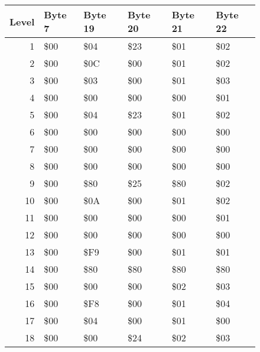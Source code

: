 \begin{figure}[H]
  {
    \setlength{\tabcolsep}{3.0pt}
    \setlength\cmidrulewidth{\heavyrulewidth} %
    \begin{adjustbox}{width=\textwidth}

      \begin{tabular}{rlllll}
        \toprule
        Level & Byte 7    & Byte 19   & Byte 20   & Byte 21   & Byte 22   \\
        \midrule
        1 & \$00       & \$04       & \$23       & \$01       & \$02       \\
        2 & \$00       & \$0C       & \$00       & \$01       & \$02       \\
        3 & \$00       & \$03       & \$00       & \$01       & \$03       \\
        4 & \$00       & \$00       & \$00       & \$00       & \$01       \\
        5 & \$00       & \$04       & \$23       & \$01       & \$02       \\
        6 & \$00       & \$00       & \$00       & \$00       & \$00       \\
        7 & \$00       & \$00       & \$00       & \$00       & \$00       \\
        8 & \$00       & \$00       & \$00       & \$00       & \$00       \\
        9 & \$00       & \$80       & \$25       & \$80       & \$02       \\
        10 & \$00       & \$0A       & \$00       & \$01       & \$02       \\
        11 & \$00       & \$00       & \$00       & \$00       & \$01       \\
        12 & \$00       & \$00       & \$00       & \$00       & \$00       \\
        13 & \$00       & \$F9       & \$00       & \$01       & \$01       \\
        14 & \$00       & \$80       & \$80       & \$80       & \$80       \\
        15 & \$00       & \$00       & \$00       & \$02       & \$03       \\
        16 & \$00       & \$F8       & \$00       & \$01       & \$04       \\
        17 & \$00       & \$04       & \$00       & \$01       & \$00       \\
        18 & \$00       & \$00       & \$24       & \$02       & \$03       \\

\end{tabular}
\end{adjustbox}}
\end{figure}
